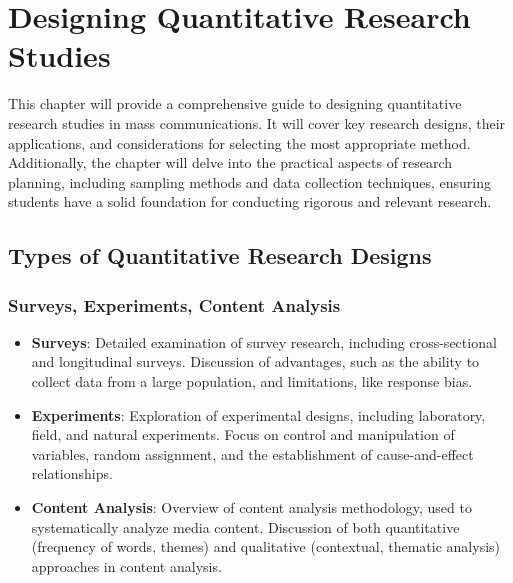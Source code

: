 \documentclass[
]{book}
\begin{document}
\hypertarget{designing-quantitative-research-studies}{%
\chapter*{Designing Quantitative Research Studies}\label{designing-quantitative-research-studies}}

This chapter will provide a comprehensive guide to designing quantitative research studies in mass communications. It will cover key research designs, their applications, and considerations for selecting the most appropriate method. Additionally, the chapter will delve into the practical aspects of research planning, including sampling methods and data collection techniques, ensuring students have a solid foundation for conducting rigorous and relevant research.

\hypertarget{types-of-quantitative-research-designs}{%
\section*{Types of Quantitative Research Designs}\label{types-of-quantitative-research-designs}}

\hypertarget{surveys-experiments-content-analysis}{%
\subsection*{Surveys, Experiments, Content Analysis}\label{surveys-experiments-content-analysis}}

\begin{itemize}
\item
  \textbf{Surveys}: Detailed examination of survey research, including cross-sectional and longitudinal surveys. Discussion of advantages, such as the ability to collect data from a large population, and limitations, like response bias.
\item
  \textbf{Experiments}: Exploration of experimental designs, including laboratory, field, and natural experiments. Focus on control and manipulation of variables, random assignment, and the establishment of cause-and-effect relationships.
\item
  \textbf{Content Analysis}: Overview of content analysis methodology, used to systematically analyze media content. Discussion of both quantitative (frequency of words, themes) and qualitative (contextual, thematic analysis) approaches in content analysis.
\end{itemize}
\end{document}
